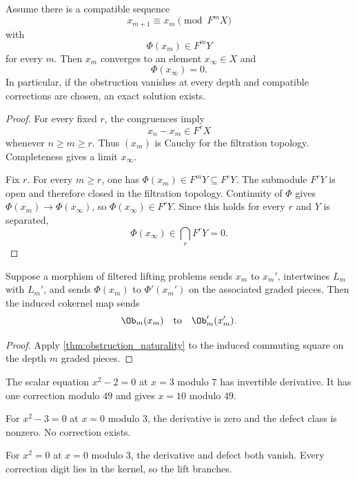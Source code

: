 \begin{theorem}\label{thm:complete_filtered_lifting}
Assume there is a compatible sequence
\[
x_{m+1}\equiv x_m\pmod{F^mX}
\]
with
\[
\Phi(x_m)\in F^mY
\]
for every $m$.  Then $x_m$ converges to an element $x_\infty\in X$ and
\[
\Phi(x_\infty)=0.
\]
In particular, if the obstruction vanishes at every depth and compatible corrections are chosen, an exact solution exists.
\end{theorem}

\begin{proof}
For every fixed $r$, the congruences imply
\[
x_n-x_m\in F^rX
\]
whenever $n\ge m\ge r$.  Thus $(x_m)$ is Cauchy for the filtration topology.  Completeness gives a limit $x_\infty$.

Fix $r$.  For every $m\ge r$, one has $\Phi(x_m)\in F^mY\subseteq F^rY$.  The submodule $F^rY$ is open and therefore closed in the filtration topology.  Continuity of $\Phi$ gives $\Phi(x_m)\to\Phi(x_\infty)$, so $\Phi(x_\infty)\in F^rY$.  Since this holds for every $r$ and $Y$ is separated,
\[
\Phi(x_\infty)\in\bigcap_rF^rY=0.
\]
\end{proof}

\begin{theorem}\label{thm:filtered_obstruction_naturality}
Suppose a morphism of filtered lifting problems sends $x_m$ to $x_m'$, intertwines $L_m$ with $L_m'$, and sends $\Phi(x_m)$ to $\Phi'(x_m')$ on the associated graded pieces.  Then the induced cokernel map sends
\[
\Ob_m(x_m)
\quad\text{to}\quad
\Ob_m'(x_m').
\]
\end{theorem}

\begin{proof}
Apply \cref{thm:obstruction_naturality} to the induced commuting square on the depth $m$ graded pieces.
\end{proof}

\begin{example}\label{ex:three_lifting_outcomes}
The scalar equation $x^2-2=0$ at $x=3$ modulo $7$ has invertible derivative.  It has one correction modulo $49$ and gives $x=10$ modulo $49$.

For $x^2-3=0$ at $x=0$ modulo $3$, the derivative is zero and the defect class is nonzero.  No correction exists.

For $x^2=0$ at $x=0$ modulo $3$, the derivative and defect both vanish.  Every correction digit lies in the kernel, so the lift branches.
\end{example}

